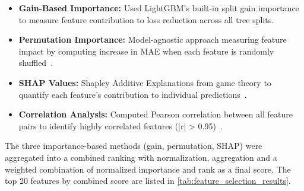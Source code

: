 \begin{itemize}
    \item \textbf{Gain-Based Importance:} Used LightGBM's built-in split gain importance to measure feature contribution to loss reduction across all tree splits.
    \item \textbf{Permutation Importance:} Model-agnostic approach measuring feature impact by computing increase in MAE when each feature is randomly shuffled~\cite{breiman2001random}.
    \item \textbf{SHAP Values:} Shapley Additive Explanations from game theory to quantify each feature's contribution to individual predictions~\cite{lundberg2017unified}.
    \item \textbf{Correlation Analysis:} Computed Pearson correlation between all feature pairs to identify highly correlated features (|r| > 0.95)~\cite{pearson1895notes}.
\end{itemize}

The three importance-based methods (gain, permutation, SHAP) were aggregated into a combined ranking with normalization, aggregation and a weighted combination of normalized importance and rank as a final score. The top 20 features by combined score are listed in \autoref{tab:feature_selection_results}.

